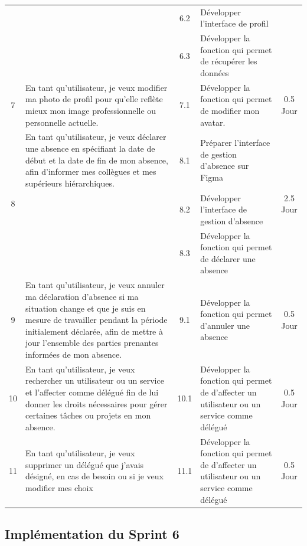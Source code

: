 \begin{adjustwidth}{-1cm}{}
\begin{longtable}{|c|p{6cm}|c|p{6cm}|c|}
      \cline{3-4}
      & & 6.2 & Développer l'interface de profil & \\
      \cline{3-4}
      & & 6.3 & Développer la fonction qui permet de récupérer les données & \\
      \cline{1-5}
      \multirow{1}{*}{7} & En tant qu'utilisateur, je veux modifier ma photo de profil pour qu'elle reflète mieux mon image professionnelle ou personnelle actuelle.& 7.1 & Développer la fonction qui permet de modifier mon avatar. & \multirow{1}{*}{0.5 Jour} \\
      \cline{1-5}
      \multirow{3}{*}{8} & En tant qu'utilisateur, je veux déclarer une absence en spécifiant la date de début et la date de fin de mon absence, afin d'informer mes collègues et mes supérieurs hiérarchiques.& 8.1 & Préparer l'interface de gestion d'absence sur Figma & \multirow{3}{*}{2.5 Jour} \\
      \cline{3-4}
      & & 8.2 & Développer l'interface de gestion d'absence & \\
      \cline{3-4}
      & & 8.3 & Développer la fonction qui permet de déclarer une absence & \\
      \cline{1-5}
      \multirow{1}{*}{9} & En tant qu'utilisateur, je veux annuler ma déclaration d'absence si ma situation change et que je suis en mesure de travailler pendant la période initialement déclarée, afin de mettre à jour l'ensemble des parties prenantes informées de mon absence. & 9.1 & Développer la fonction qui permet d'annuler une absence & \multirow{1}{*}{0.5 Jour} \\
      \cline{1-5}
      \multirow{1}{*}{10} & En tant qu'utilisateur, je veux rechercher un utilisateur ou un service et l'affecter comme délégué fin de lui donner les droits nécessaires pour gérer certaines tâches ou projets en mon absence. & 10.1 & Développer la fonction qui permet de d'affecter un utilisateur ou un service comme délégué   & \multirow{1}{*}{0.5 Jour} \\
      \cline{1-5}
      \multirow{1}{*}{11} & En tant qu'utilisateur, je veux supprimer un délégué que j'avais désigné, en cas de besoin ou si je veux modifier mes choix & 11.1 & Développer la fonction qui permet de d'affecter un utilisateur ou un service comme délégué   & \multirow{1}{*}{0.5 Jour} \\
    \hline

\end{longtable}
\end{adjustwidth}


\subsection{Implémentation du Sprint 6}


